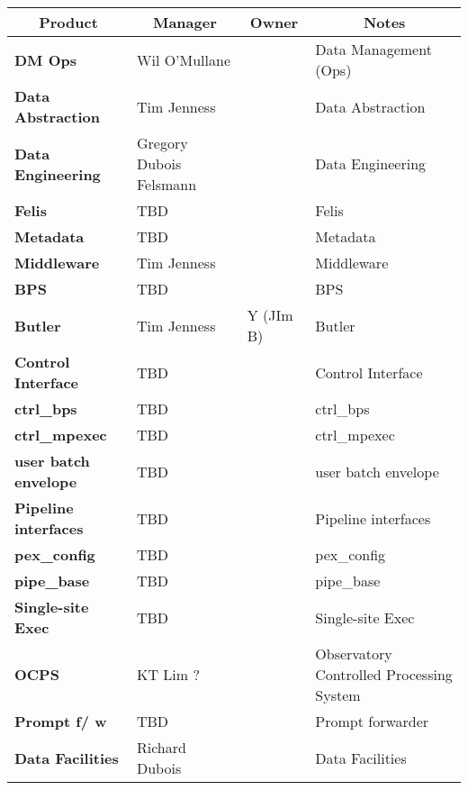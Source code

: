 

\scriptsize
\begin{longtable}{
p{}   |p{}|p{} |p{}|}
\multicolumn{1}{c|}{\textbf{Product}} &
\multicolumn{1}{c|}{\textbf{Manager}} &
\multicolumn{1}{c|}{\textbf{Owner}} &
\multicolumn{1}{c}{\textbf{Notes}}\\ \hline
{\textbf{DM Ops}} & Wil O'Mullane &  & Data Management (Ops) \\ \hline
{\textbf{Data Abstraction}} & Tim Jenness &  & Data Abstraction \\ \hline
{\textbf{Data Engineering}} & Gregory Dubois Felsmann &  & Data Engineering \\ \hline
{\textbf{Felis}} & TBD &  & Felis \\ \hline
{\textbf{Metadata}} & TBD &  & Metadata \\ \hline
{\textbf{Middleware}} & Tim Jenness &  & Middleware \\ \hline
{\textbf{BPS}} & TBD &  & BPS \\ \hline
{\textbf{Butler}} & Tim Jenness & Y (JIm B) & Butler \\ \hline
{\textbf{Control Interface}} & TBD &  & Control Interface \\ \hline
{\textbf{ctrl\_bps}} & TBD &  & ctrl\_bps \\ \hline
{\textbf{ctrl\_mpexec}} & TBD &  & ctrl\_mpexec \\ \hline
{\textbf{user batch envelope}} & TBD &  & user batch envelope \\ \hline
{\textbf{Pipeline interfaces}} & TBD &  & Pipeline interfaces \\ \hline
{\textbf{pex\_config}} & TBD &  & pex\_config \\ \hline
{\textbf{pipe\_base}} & TBD &  & pipe\_base \\ \hline
{\textbf{Single-site Exec}} & TBD &  & Single-site Exec \\ \hline
{\textbf{OCPS}} & KT Lim ? &  & Observatory Controlled Processing System \\ \hline
{\textbf{Prompt f/ w}} & TBD &  & Prompt forwarder \\ \hline
{\textbf{Data Facilities}} & Richard Dubois &  & Data Facilities \\ \hline

\end{longtable}

